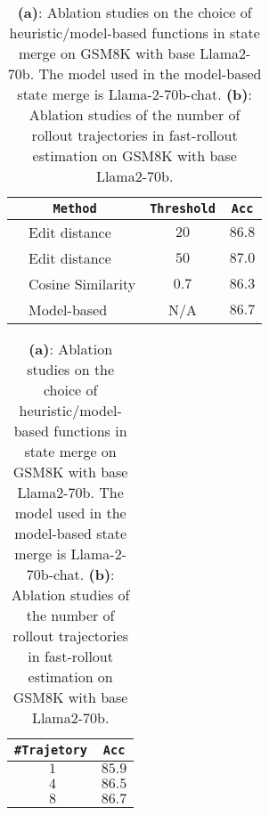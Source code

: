 

\begin{table}[h]
\small
\centering
\begin{minipage}{.45\linewidth}
\centering

    \begin{tabular}{cl|c|c}
    \toprule
        \multicolumn{2}{c|}{\texttt{Method}}         & \texttt{Threshold}  & \texttt{Acc}\\
        \midrule
           &   Edit distance	               & $20$ & $86.8$ \\
           &   Edit distance	             & $50$ & $87.0$\\
           &  Cosine Similarity	            & $0.7$ & $86.3$\\
           & Model-based	& N/A	& $86.7$ \\
        \bottomrule
    \end{tabular}
\vspace{2mm}
\caption*{(a) Ablation on the choice of state merge functions.}
\end{minipage}%
\begin{minipage}{.55\linewidth}
\centering

    \begin{tabular}{cl|c}
    \toprule
        \multicolumn{2}{c|}{\texttt{\#Trajetory}}         & \texttt{Acc}\\
        \midrule
           &   $1$	                & $85.9$ \\
           &   $4$	           & $86.5$\\
           &  $8$	       & $86.7$\\
        \bottomrule
    \end{tabular}
\vspace{2mm}
\caption*{(b) Ablation on the number of trajectories.}
\end{minipage}
\caption{\textbf{(a)}: Ablation studies on the choice of heuristic/model-based functions in state merge on GSM8K with base Llama2-70b. The model used in the model-based state merge is Llama-2-70b-chat. \textbf{(b)}: Ablation studies of the number of rollout trajectories in fast-rollout estimation on GSM8K with base Llama2-70b.}
\label{table:ablation_sm}
\end{table}
